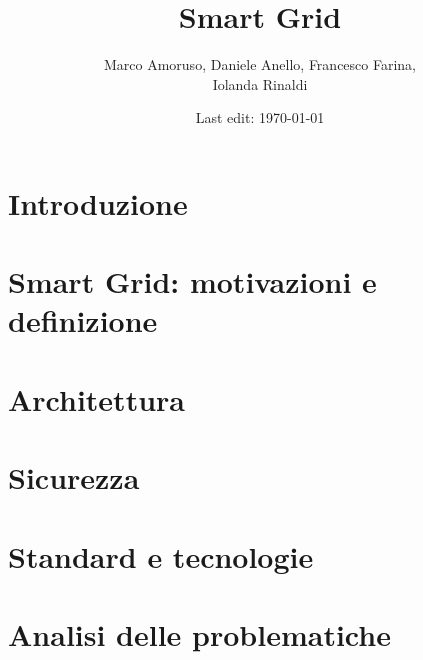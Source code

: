 \documentclass[11pt,oneside]{book}
\title{Smart Grid} %
\author{Marco Amoruso, Daniele Anello, Francesco Farina, \\Iolanda Rinaldi } %
\date{Last edit: \today} %
\newcommand{\initial}[1]{ %
\lettrine[lines=3,lhang=0.3,nindent=0em]{
\color{DarkGoldenrod}
{\textsf{#1}}}{}}
\begin{document}
\maketitle %

\thispagestyle{fancy} %



\tableofcontents
\chapter{Introduzione}

\chapter{Smart Grid: motivazioni e definizione}

\chapter{Architettura}

\chapter{Sicurezza}

\chapter{Standard e tecnologie \label{chap:chap5}}

\chapter{Analisi delle problematiche}

\end{document}
